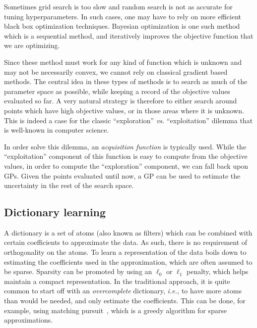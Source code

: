 Sometimes grid search is too slow and random search is not as accurate for tuning hyperparameters. In such cases, one may have to rely on more efficient black box optimization techniques. Bayesian optimization is one such method which is a sequential method, and iteratively improves the objective function that we are optimizing.

Since these method must work for any kind of function which is unknown and may not be necessarily convex, we cannot rely on classical gradient based methods. The central idea in these types of methods is to search as much of the parameter space as possible, while keeping a record of the objective values evaluated so far. A very natural strategy is therefore to either search around points which have high objective values, or in those areas where it is unknown. This is indeed a case for the classic  ``exploration'' \emph{vs.} ``exploitation'' dilemma that is well-known in computer science.

In order solve this dilemma, an \emph{acquisition function} is typically used. While the ``exploitation'' component of this function is easy to compute from the objective values, in order to compute the ``exploration'' component, we can fall back upon \acp{GP}. Given the points evaluated until now, a \ac{GP} can be used to estimate the uncertainty in the rest of the search space. 

\subsection{Dictionary learning}

A dictionary is a set of atoms (also known as filters) which can be combined with certain coefficients to approximate the data. As such, there is no requirement of orthogonality on the atoms. To learn a representation of the data boils down to estimating the coefficients used in the approximation, which are often assumed to be sparse. Sparsity can be promoted by using an $\ell_0$ or $\ell_1$ penalty, which helps maintain a compact representation. In the traditional approach, it is quite common to start off with an \emph{overcomplete} dictionary, \emph{i.e.,} to have more atoms than would be needed, and only estimate the coefficients. This can be done, for example, using matching pursuit~\citep{mallat1993matching}, which is a greedy algorithm for sparse approximations.

